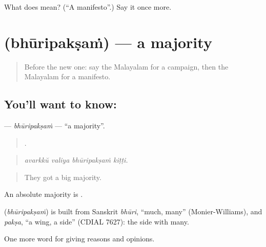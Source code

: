 \begin{tcolorbox}[breakable,colback=teal!4,colframe=teal!35!black,title={Before you move on}]
What does  mean? (\textquotedblleft{}A manifesto\textquotedblright{}.) Say it once more.
\end{tcolorbox}
\section[\texorpdfstring{\ml{ഭൂരിപക്ഷം} (bhūripakṣaṁ)}{ഭൂരിപക്ഷം (bhūripakṣaṁ)}]{ (bhūripakṣaṁ) — a majority}

\label{lesson:ML-C420-bhuripaksam}



\begin{quote}
Before the new one: say the Malayalam for a campaign, then the Malayalam for a manifesto.
\end{quote}

\subsection*{You'll want to know: }
\textbf{} — \emph{bhūripakṣaṁ} — \textquotedblleft{}a majority\textquotedblright{}.

\begin{quote}
   .
\end{quote}

\begin{quote}
\emph{avarkkŭ valiya bhūripakṣaṁ kiṭṭi.}
\end{quote}

\begin{quote}
They got a big majority.
\end{quote}

An absolute majority is  .

\begin{cousinweb}
\textbf{} (\emph{bhūripakṣaṁ}) is built from Sanskrit \emph{bhūri}, \textquotedblleft{}much, many\textquotedblright{} (Monier-Williams), and \emph{pakṣa}, \textquotedblleft{}a wing, a side\textquotedblright{} (CDIAL 7627): the side with many.
\end{cousinweb}

\begin{grammarlens}[title={What you've built}]
One more word for giving reasons and opinions.
\end{grammarlens}

